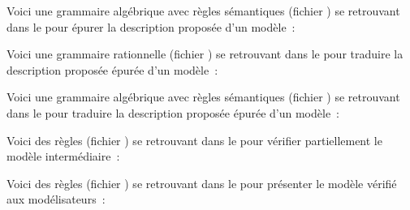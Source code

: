  
\vspace{\baselineskip}\par

Voici une grammaire algébrique avec règles sémantiques (fichier ) se retrouvant dans le  pour épurer la description proposée d'un modèle~:

\vspace{\baselineskip}\par

 

Voici une grammaire rationnelle (fichier  ) se retrouvant dans le  pour traduire la description proposée épurée d'un modèle~:

 

\vspace{\baselineskip}\par

Voici une grammaire algébrique avec règles sémantiques (fichier  ) se retrouvant dans le  pour traduire la description proposée épurée d'un modèle~:

 

\vspace{\baselineskip}\par

Voici des règles (fichier  ) se retrouvant dans le  pour vérifier partiellement le modèle intermédiaire~:

 

Voici des règles (fichier  ) se retrouvant dans le  pour présenter le modèle vérifié aux modélisateurs~:

 

\vspace{\baselineskip}\par

